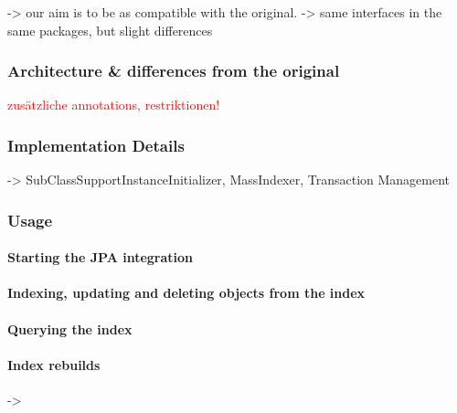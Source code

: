 -> our aim is to be as compatible with the original. -> same interfaces in the same packages, but slight differences

\subsubsection{Architecture \& differences from the original}

\textcolor{red}{zusätzliche annotations, restriktionen!}

\subsubsection{Implementation Details}

-> SubClassSupportInstanceInitializer, MassIndexer, Transaction Management

\subsubsection{Usage}

\paragraph{Starting the JPA integration}

\paragraph{Indexing, updating and deleting objects from the index}

\paragraph{Querying the index}

\paragraph{Index rebuilds}

-> 


\pagebreak